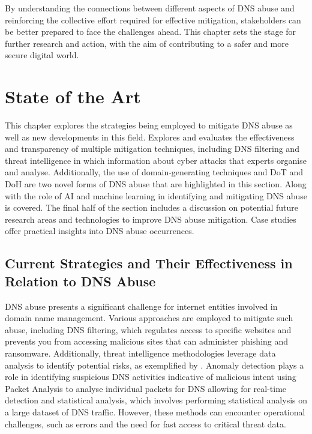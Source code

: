 By understanding the connections between different aspects of DNS abuse and reinforcing the collective effort required for effective mitigation, stakeholders can be better prepared to face the challenges ahead. This chapter sets the stage for further research and action, with the aim of contributing to a safer and more secure digital world.

\chapter{State of the Art}

This chapter explores the strategies being employed to mitigate DNS abuse as well as new developments in this field. Explores and evaluates the effectiveness and transparency of multiple mitigation techniques, including DNS filtering and threat intelligence in which information about cyber attacks that experts organise and analyse. Additionally, the use of domain-generating techniques and DoT and DoH are two novel forms of DNS abuse that are highlighted in this section. Along with the role of AI and machine learning in identifying and mitigating DNS abuse is covered. The final half of the section includes a discussion on potential future research areas and technologies to improve DNS abuse mitigation. Case studies offer practical insights into DNS abuse occurrences. 

\section{Current Strategies and Their Effectiveness in Relation to DNS Abuse}

DNS abuse presents a significant challenge for internet entities involved in domain name management. Various approaches are employed to mitigate such abuse, including DNS filtering, which regulates access to specific websites and prevents you from accessing malicious sites that can administer phishing and ransomware. Additionally, threat intelligence methodologies leverage data analysis to identify potential risks, as exemplified by \cite{schmid2021thirty}. Anomaly detection plays a role in identifying suspicious DNS activities indicative of malicious intent using Packet Analysis to analyse individual packets for DNS allowing for real-time detection and statistical analysis, which involves performing statistical analysis on a large dataset of DNS traffic. However, these methods can encounter operational challenges, such as errors and the need for fast access to critical threat data. 

